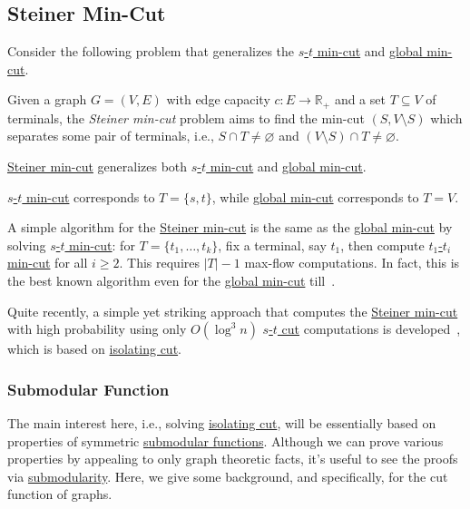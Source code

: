 \subsection{Steiner Min-Cut}
Consider the following problem that generalizes the \hyperref[prb:s-t-min-cut]{\(s\)-\(t\) min-cut} and \hyperref[prb:global-min-cut]{global min-cut}.

\begin{problem}\label{prb:Steiner-min-cut}
Given a graph \(G = (V, E)\) with edge capacity \(c \colon E \to \mathbb{R} _+ \) and a set \(T \subseteq V\) of terminals, the \emph{Steiner min-cut} problem aims to find the min-cut \((S, V\setminus S)\) which separates some pair of terminals, i.e., \(S \cap T \neq \varnothing \) and \((V \setminus S) \cap T \neq \varnothing \).
\end{problem}

\begin{remark}
	\hyperref[prb:Steiner-min-cut]{Steiner min-cut} generalizes both \hyperref[prb:s-t-min-cut]{\(s\)-\(t\) min-cut} and \hyperref[prb:global-min-cut]{global min-cut}.
\end{remark}
\begin{explanation}
	\hyperref[prb:s-t-min-cut]{\(s\)-\(t\) min-cut} corresponds to \(T = \{ s, t \} \), while \hyperref[prb:global-min-cut]{global min-cut} corresponds to \(T = V\).
\end{explanation}

A simple algorithm for the \hyperref[prb:Steiner-min-cut]{Steiner min-cut} is the same as the \hyperref[prb:global-min-cut]{global min-cut} by solving \hyperref[prb:s-t-min-cut]{\(s\)-\(t\) min-cut}: for \(T = \{ t_1, \dots , t_k \} \), fix a terminal, say \(t_1\), then compute \hyperref[prb:s-t-min-cut]{\(t_1\)-\(t_i\) min-cut} for all \(i \geq 2\). This requires \(\lvert T \rvert - 1\) max-flow computations. In fact, this is the best known algorithm even for the \hyperref[prb:global-min-cut]{global min-cut} till~\cite{nagamochi1992computing}.

Quite recently, a simple yet striking approach that computes the \hyperref[prb:Steiner-min-cut]{Steiner min-cut} with high probability using only \(O(\log ^3 n)\) \hyperref[prb:s-t-min-cut]{\(s\)-\(t\) cut} computations is developed~\cite{li2020deterministic}, which is based on \hyperref[prb:isolating-cut]{isolating cut}.

\subsubsection{Submodular Function}
The main interest here, i.e., solving \hyperref[prb:isolating-cut]{isolating cut}, will be essentially based on properties of symmetric \hyperref[def:submodular]{submodular functions}. Although we can prove various properties by appealing to only graph theoretic facts, it's useful to see the proofs via \hyperref[def:submodular]{submodularity}. Here, we give some background, and specifically, for the cut function of graphs.

